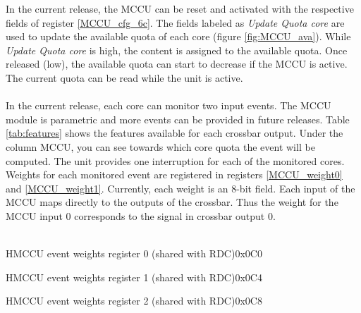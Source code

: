 In the current release, the MCCU can be reset and activated with the respective fields of register \ref{MCCU_cfg_6c}. The fields labeled as \textit{Update Quota core} are used to update the available quota of each core (figure \ref{fig:MCCU_ava}). While  \textit{Update Quota core} is high, the content is assigned to the available quota. Once released (low), the available quota can start to decrease if the MCCU is active. The current quota can be read while the unit is active.\\
\\
In the current release, each core can monitor two input events. The MCCU module is parametric and more events can be provided in future releases.  Table \ref{tab:features} shows the features available for each crossbar output. Under the column MCCU, you can see towards which core quota the event will be computed.
The unit provides one interruption for each of the monitored cores.
\\
Weights for each monitored event are registered in registers \ref{MCCU_weight0} and \ref{MCCU_weight1}. Currently, each weight is an 8-bit field. Each input of the MCCU maps directly to the outputs of the crossbar. Thus the weight for the MCCU input 0 corresponds to the signal in crossbar output 0.\\
\\
\begin{register}{H}{MCCU event weights register 0 (shared with RDC)}{0x0C0}
	\label{MCCU_weight0}
	\regnewline
\end{register}
\begin{register}{H}{MCCU event weights register 1 (shared with RDC)}{0x0C4}
	\label{MCCU_weight1}
	\regnewline
\end{register}
\begin{register}{H}{MCCU event weights register 2 (shared with RDC)}{0x0C8}
	\label{MCCU_weight2}
	\regnewline
\end{register}

